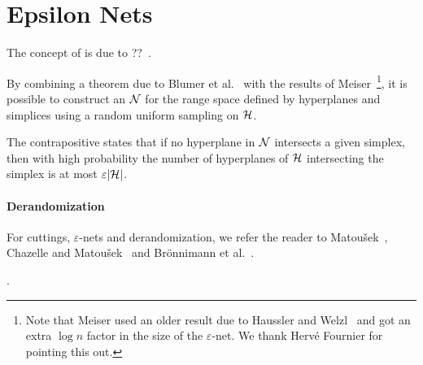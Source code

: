 \section{Epsilon Nets}%
\label{sec:divide-and-conquer:epsilon-nets}

The concept of \enets{} is due to ??~\cite{???}.
%


By combining a theorem due to Blumer et
al.~\cite{BEHW89} with the results of Meiser~\cite{M93}\footnote{Note that
Meiser used an older result due to Haussler and Welzl~\cite{H87} and got an
extra $\log n$ factor in the size of the $\varepsilon$-net. We thank Hervé
Fournier for pointing this out.}, it is possible to
construct an \enet{} \(\mathcal{N}\) for the range space
defined by hyperplanes and simplices using a random uniform sampling on \(\mathcal{H}\).
%

%
The contrapositive states that if no hyperplane in \(\mathcal{N}\) intersects
a given simplex, then with high probability the number of hyperplanes of
\(\mathcal{H}\) intersecting the simplex is at most \(\varepsilon |{\mathcal{H}}|\).

\paragraph{Derandomization}


For cuttings, $\varepsilon$-nets and derandomization, we
refer the reader to Matou\v{s}ek~\cite{M95,M96}, Chazelle and
Matou\v{s}ek~\cite{CM96} and Brönnimann et al.~\cite{BCM99}.

.

